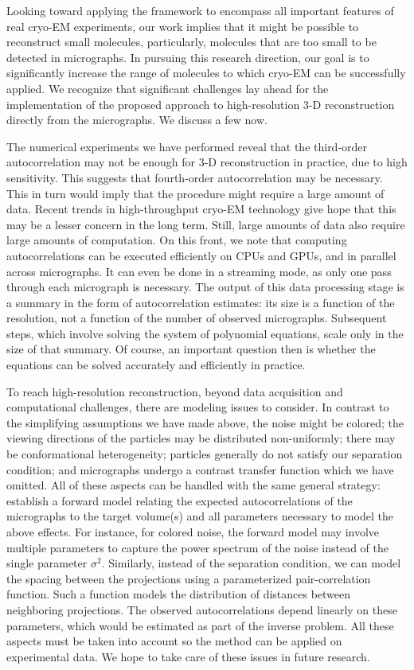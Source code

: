 \documentclass[12pt]{article}
\newcommand{\1}{\mathbf{1}}
\theoremstyle{plain}
\theoremstyle{definition}
\theoremstyle{remark}
\theoremstyle{plain}
\theoremstyle{remark}
\theoremstyle{plain}
\theoremstyle{plain}
\begin{document}
Looking toward applying the framework to encompass all important features of real cryo-EM experiments, our work implies that it might be possible to reconstruct small molecules, particularly, molecules that are too small to be detected in micrographs. 
In pursuing this research direction, our goal is to significantly increase the range of molecules to which cryo-EM can be successfully applied.
We recognize that significant challenges lay ahead for the implementation of the proposed approach to {high-resolution} 3-D reconstruction directly from the micrographs. We discuss a few now.

The numerical experiments we have performed reveal that the third-order autocorrelation may not be enough for 3-D reconstruction in practice, due to high sensitivity.
This suggests that fourth-order autocorrelation may be necessary. This in turn would imply that the procedure might require a large amount of data. 
Recent trends in high-throughput cryo-EM technology   give hope that this may be a lesser concern in the long term. Still, large amounts of data also require large amounts of computation. On this front, we note that computing autocorrelations can be executed efficiently on CPUs and GPUs, and in parallel across micrographs. It can even be done in a  streaming mode, as only one pass through each micrograph is necessary. The output of this data processing stage is a summary in the form of autocorrelation estimates: its size is a function of the resolution, not a function of the number of observed micrographs. Subsequent steps, which involve solving the system of polynomial equations, scale only in the size of that summary. Of course, an important question then is whether the equations can be solved accurately and efficiently in practice. 

To reach high-resolution reconstruction, beyond data acquisition and computational challenges, there are modeling issues  to consider.
In contrast to the simplifying assumptions we have made above, the noise might be colored; the viewing directions of the particles may be distributed non-uniformly; there may be conformational heterogeneity; particles generally do not satisfy our separation condition; and micrographs undergo a contrast transfer function which we have omitted. All of these aspects can be handled with the same general strategy: establish a forward model relating the expected autocorrelations of the micrographs to the target volume(s) and all parameters necessary to model the above effects. 
For instance, for colored noise, the forward model may involve multiple parameters to capture the power spectrum of the noise instead of the single parameter $\sigma^2$. 
Similarly, instead of the separation condition, we can model the spacing between the projections using a parameterized pair-correlation function. Such a function models the distribution of distances between neighboring projections. The observed autocorrelations depend linearly on these parameters, which would be estimated as part of the inverse problem.
All these aspects must be taken into account so the method can be applied on experimental data. We hope to take care of these issues in future research. 
\end{document}
